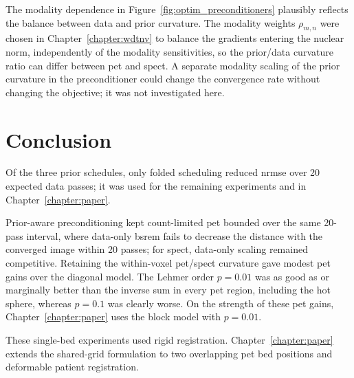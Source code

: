 The modality dependence in Figure~\ref{fig:optim_preconditioners} plausibly reflects the balance between data and prior curvature. The modality weights $\rho_{m,n}$ were chosen in Chapter~\ref{chapter:wdtnv} to balance the gradients entering the nuclear norm, independently of the modality sensitivities, so the prior/data curvature ratio can differ between \gls{pet} and \gls{spect}. A separate modality scaling of the prior curvature in the preconditioner could change the convergence rate without changing the objective; it was not investigated here.

\section{Conclusion}
\label{sec:optimisation_conclusion}

Of the three prior schedules, only folded scheduling reduced \gls{nrmse} over 20 expected data passes; it was used for the remaining experiments and in Chapter~\ref{chapter:paper}.

Prior-aware preconditioning kept count-limited \gls{pet} bounded over the same 20-pass interval, where data-only \gls{bsrem} fails to decrease the distance with the converged image within 20 passes; for \gls{spect}, data-only scaling remained competitive. Retaining the within-voxel \gls{pet}/\gls{spect} curvature gave modest \gls{pet} gains over the diagonal model. The Lehmer order $p=0.01$ was as good as or marginally better than the inverse sum in every \gls{pet} region, including the hot sphere, whereas $p=0.1$ was clearly worse. On the strength of these \gls{pet} gains, Chapter~\ref{chapter:paper} uses the block model with $p=0.01$.

These single-bed experiments used rigid registration. Chapter~\ref{chapter:paper} extends the shared-grid formulation to two overlapping \gls{pet} bed positions and deformable patient registration.

